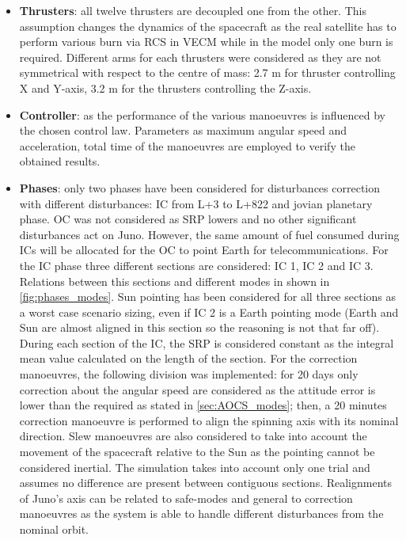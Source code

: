 \begin{itemize}
    \item \textbf{Thrusters}: all twelve thrusters are decoupled one from the other. This assumption changes the dynamics of the spacecraft as the real satellite has to perform various burn via RCS in VECM while in the model only one burn is required. 
    Different arms for each thrusters were considered as they are not symmetrical with respect to the centre of mass: 2.7 m for thruster controlling X and Y-axis, 3.2 m for the thrusters controlling the Z-axis.

    \item \textbf{Controller}: as the performance of the various manoeuvres is influenced by the chosen control law. Parameters as maximum angular speed and acceleration, total time of the manoeuvres are employed to verify the obtained results. 
    
    \item \textbf{Phases}: only two phases have been considered for disturbances correction with different disturbances: IC from L+3 to L+822 and jovian planetary phase. 
    OC was not considered as SRP lowers and no other significant disturbances act on Juno. However, the same amount of fuel consumed during ICs will be allocated for the OC to point Earth for telecommunications.
    For the IC phase three different sections are considered: IC 1, IC 2 and IC 3. Relations between this sections and different modes in shown in \autoref{fig:phases_modes}.
    Sun pointing has been considered for all three sections as a worst case scenario sizing, even if IC 2 is a Earth pointing mode (Earth and Sun are almost aligned in this section so the reasoning is not that far off). During each section of the IC, the SRP is considered constant as the integral mean value calculated on the length of the section.
    For the correction manoeuvres, the following division was implemented: for 20 days only correction about the angular speed are considered as the attitude error is lower than the required as stated in \autoref{sec:AOCS_modes}; then, a 20 minutes correction manoeuvre is performed to align the spinning axis with its nominal direction. Slew manoeuvres are also considered to take into account the movement of the spacecraft relative to the Sun as the pointing cannot be considered inertial. The simulation takes into account only one trial and assumes no difference are present between contiguous sections. Realignments of Juno's axis can be related to safe-modes and general to correction manoeuvres as the system is able to handle different disturbances from the nominal orbit. 
    

\end{itemize}
